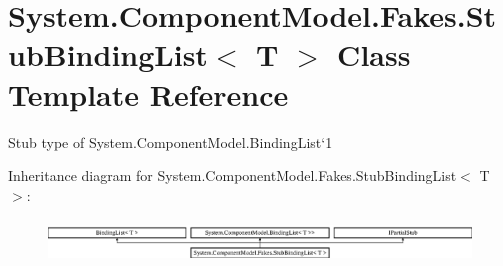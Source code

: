\hypertarget{class_system_1_1_component_model_1_1_fakes_1_1_stub_binding_list_3_01_t_01_4}{\section{System.\-Component\-Model.\-Fakes.\-Stub\-Binding\-List$<$ T $>$ Class Template Reference}
\label{class_system_1_1_component_model_1_1_fakes_1_1_stub_binding_list_3_01_t_01_4}
}


Stub type of System.\-Component\-Model.\-Binding\-List`1 


Inheritance diagram for System.\-Component\-Model.\-Fakes.\-Stub\-Binding\-List$<$ T $>$\-:\begin{figure}[H]
\begin{center}
\leavevmode
\includegraphics[height=1.163032cm]{class_system_1_1_component_model_1_1_fakes_1_1_stub_binding_list_3_01_t_01_4}
\end{center}
\end{figure}
